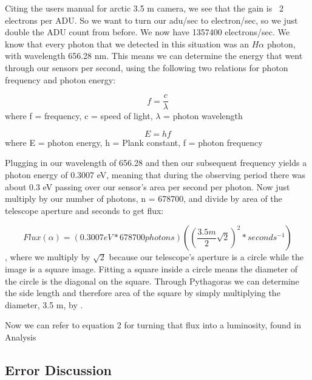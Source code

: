 \documentclass[modern]{aastex63}
\begin{document}
Citing the users manual for arctic 3.5 m camera, we see that the gain is ~2 electrons per ADU. So we want to turn our adu/sec to electron/sec, so we just double the ADU count from before. We now have 1357400 electrons/sec. We know that every photon that we detected in this situation was an $H\alpha$ photon, with wavelength 656.28 nm. This means we can determine the energy that went through our sensors per second, using the following two relations for photon frequency and photon energy:

\begin{equation}\label{'Equation 1'}
f = \frac{c}{\lambda}
\end{equation} where f = frequency, c = speed of light, $\lambda$ = photon wavelength

\begin{equation}\label{'Equation 1'}
E = h f
\end{equation} where E = photon energy, h = Plank constant, f = photon frequency \citep{2001JRASC..95...32L}

Plugging in our wavelength of 656.28 and then our subsequent frequency yields a photon energy of 0.3007 eV, meaning that during the observing period there was about 0.3 eV passing over our sensor's area per second per photon. Now just multiply by our number of photons, n = 678700, and divide by area of the telescope aperture and seconds to get flux:

\begin{equation}
Flux(\alpha) = (0.3007 eV * 678700 photons)((\frac{3.5m}{2} \sqrt{2})^2 * seconds^{-1})
\end{equation}, where we multiply by $\sqrt{2}$ because our telescope's aperture is a circle while the image is a square image. Fitting a square inside a circle means the diameter of the circle is the diagonal on the square. Through Pythagoras we can determine the side length and therefore area of the square by simply multiplying the diameter, 3.5 m, by .

Now we can refer to equation 2 for turning that flux into a luminosity, found in Analysis

\subsection{Error Discussion}
\end{document}
